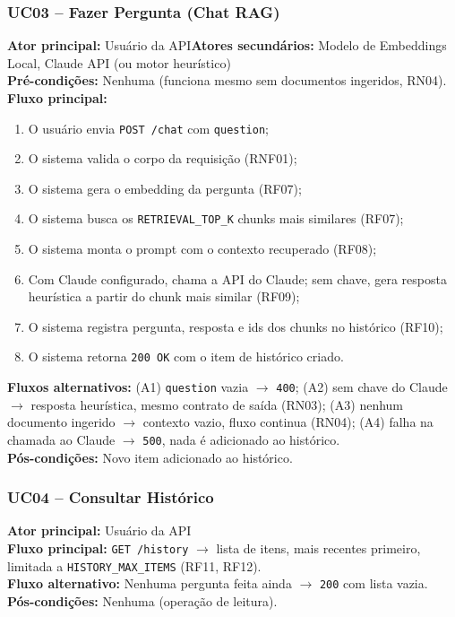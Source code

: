 \documentclass[11pt,a4paper]{article}
\begin{document}
\subsubsection{UC03 -- Fazer Pergunta (Chat RAG)}
\textbf{Ator principal:} Usuário da API\quad\textbf{Atores secundários:} Modelo de
Embeddings Local, Claude API (ou motor heurístico)\\
\textbf{Pré-condições:} Nenhuma (funciona mesmo sem documentos ingeridos, RN04).\\
\textbf{Fluxo principal:}
\begin{enumerate}[leftmargin=1.2cm]
    \item O usuário envia \texttt{POST /chat} com \texttt{question};
    \item O sistema valida o corpo da requisição (RNF01);
    \item O sistema gera o embedding da pergunta (RF07);
    \item O sistema busca os \texttt{RETRIEVAL\_TOP\_K} chunks mais similares
          (RF07);
    \item O sistema monta o prompt com o contexto recuperado (RF08);
    \item Com Claude configurado, chama a API do Claude; sem chave, gera resposta
          heurística a partir do chunk mais similar (RF09);
    \item O sistema registra pergunta, resposta e ids dos chunks no histórico
          (RF10);
    \item O sistema retorna \texttt{200 OK} com o item de histórico criado.
\end{enumerate}
\textbf{Fluxos alternativos:} (A1) \texttt{question} vazia $\rightarrow$
\texttt{400}; (A2) sem chave do Claude $\rightarrow$ resposta heurística, mesmo
contrato de saída (RN03); (A3) nenhum documento ingerido $\rightarrow$ contexto
vazio, fluxo continua (RN04); (A4) falha na chamada ao Claude $\rightarrow$
\texttt{500}, nada é adicionado ao histórico.\\
\textbf{Pós-condições:} Novo item adicionado ao histórico.

\subsubsection{UC04 -- Consultar Histórico}
\textbf{Ator principal:} Usuário da API\\
\textbf{Fluxo principal:} \texttt{GET /history} $\rightarrow$ lista de itens, mais
recentes primeiro, limitada a \texttt{HISTORY\_MAX\_ITEMS} (RF11, RF12).\\
\textbf{Fluxo alternativo:} Nenhuma pergunta feita ainda $\rightarrow$ \texttt{200}
com lista vazia.\\
\textbf{Pós-condições:} Nenhuma (operação de leitura).
\end{document}
